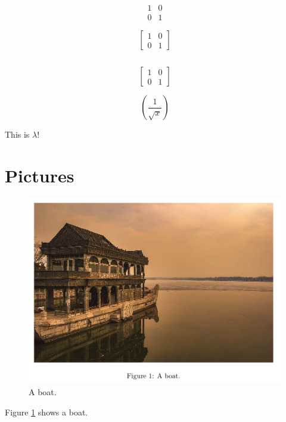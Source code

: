 \documentclass{article}
\begin{document}
    \begin{equation*}
	    \begin{matrix}
		1 & 0\\
		0 & 1
	    \end{matrix}
    \end{equation*}

    \begin{equation*}
	    \begin{bmatrix}
		1 & 0\\
		0 & 1
	    \end{bmatrix}
    \end{equation*}

    \begin{equation*}
	[
	\begin{matrix}
	    1 & 0\\
	    0 & 1
	\end{matrix}
	]
    \end{equation*}

    \begin{equation*}
	\left[
	\begin{matrix}
	    1 & 0\\
	    0 & 1
	\end{matrix}
	\right]
    \end{equation*}

    \begin{equation*}
	\left(\frac{1}{\sqrt{x}}\right)
    \end{equation*}

    This is $\lambda$!

    \newpage

    \section{Pictures}

    \begin{figure}
	\includegraphics[width=\linewidth]{images/boat.png}
	\caption{A boat.}
	\label{fig:boat1}
    \end{figure}

    Figure \ref{fig:boat1} shows a boat.
\end{document}
